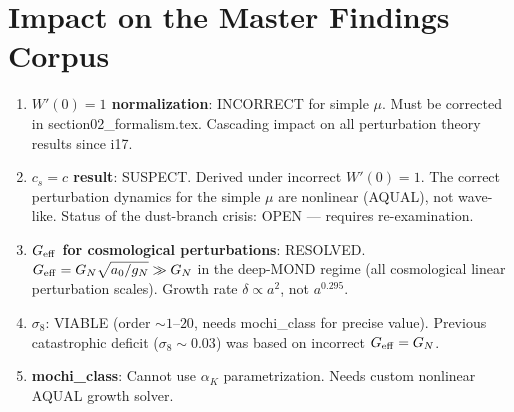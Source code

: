 \documentclass[11pt]{article}
\newcommand{\Geff}{G_{\rm eff}}
\newcommand{\aM}{a_0}
\begin{document}
\section*{Impact on the Master Findings Corpus}

\begin{enumerate}
\item \textbf{$W'(0) = 1$ normalization}: INCORRECT for simple $\mu$.
  Must be corrected in section02\_formalism.tex. Cascading impact on
  all perturbation theory results since i17.

\item \textbf{$c_s = c$ result}: SUSPECT. Derived under incorrect
  $W'(0) = 1$. The correct perturbation dynamics for the simple $\mu$
  are nonlinear (AQUAL), not wave-like. Status of the dust-branch
  crisis: OPEN --- requires re-examination.

\item \textbf{$\Geff$ for cosmological perturbations}: RESOLVED.
  $\Geff = G_N\sqrt{\aM/g_N} \gg G_N$ in the deep-MOND regime
  (all cosmological linear perturbation scales). Growth rate
  $\delta \propto a^2$, not $a^{0.295}$.

\item \textbf{$\sigma_8$}: VIABLE (order $\sim 1$--$20$, needs
  mochi\_class for precise value). Previous catastrophic deficit
  ($\sigma_8 \sim 0.03$) was based on incorrect $\Geff = G_N$.

\item \textbf{mochi\_class}: Cannot use $\alpha_K$ parametrization.
  Needs custom nonlinear AQUAL growth solver.
\end{enumerate}
\end{document}
